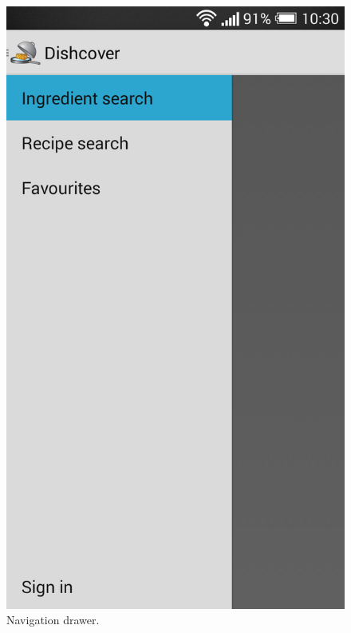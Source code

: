 \begin{figure}[H]
\begin{minipage}[t]{0.5\columnwidth}
\centering
\includegraphics[width=0.7\columnwidth]{img/screenshots/finaldrawer.png}
\caption{Navigation drawer\label{fig:navdrawer1}.}
\end{minipage}
\hspace{0.5cm}
\begin{minipage}[t]{0.5\columnwidth}
\centering

\end{minipage}
\end{figure}
